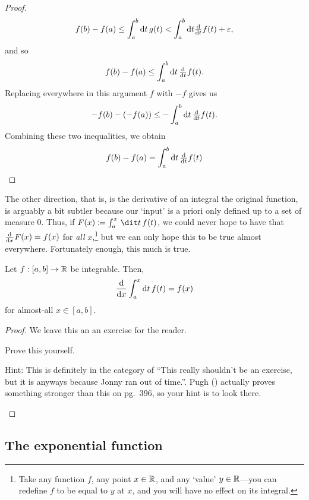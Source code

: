 \begin{thm}
\begin{proof}
\begin{equation}
f(b)-f(a)\leq \int _a^b\mathop{}\!\mathrm{d} t\, g(t)<\int _a^b\mathop{}\!\mathrm{d} t\tfrac{\mathop{}\!\mathrm{d}}{\mathop{}\!\mathrm{d} t}f(t)+\varepsilon ,
\end{equation}
and so
\begin{equation}
f(b)-f(a)\leq \int _a^b\mathop{}\!\mathrm{d} t\, \tfrac{\mathop{}\!\mathrm{d}}{\mathop{}\!\mathrm{d} t}f(t).
\end{equation}
Replacing everywhere in this argument $f$ with $-f$ gives us
\begin{equation}
-f(b)-(-f(a))\leq -\int _a^b\mathop{}\!\mathrm{d} t\, \tfrac{\mathop{}\!\mathrm{d}}{\mathop{}\!\mathrm{d} t}f(t).
\end{equation}
Combining these two inequalities, we obtain
\begin{equation}
f(b)-f(a)=\int _a^b\mathop{}\!\mathrm{d} t\, \tfrac{\mathop{}\!\mathrm{d}}{\mathop{}\!\mathrm{d} t}f(t)
\end{equation}
\end{proof}
\end{thm}
The other direction, that is, is the derivative of an integral the original function, is arguably a bit subtler because our `input' is a priori only defined up to a set of measure $0$.  Thus, if $F(x)\coloneqq \int _a^x\, \dit t\, f(t)$, we could never hope to have that $\frac{\mathop{}\!\mathrm{d}}{\mathop{}\!\mathrm{d} x}F(x)=f(x)$ for \emph{all} $x$,\footnote{Take any function $f$, any point $x\in \mathbb{R}$, and any `value' $y\in \mathbb{R}$---you can redefine $f$ to be equal to $y$ at $x$, and you will have no effect on its integral.} but we can only hope this to be true almost everywhere.  Fortunately enough, this much is true.
\begin{thm}\label{FTCI}
Let $f:[a,b]\rightarrow \mathbb{R}$ be integrable.  Then,
\begin{equation}
\frac{\mathop{}\!\mathrm{d}}{\mathop{}\!\mathrm{d} x}\int _a^x\mathop{}\!\mathrm{d} t\, f(t)=f(x)
\end{equation}
for almost-all $x\in [a,b]$.
\begin{proof}
We leave this an an exercise for the reader.
\begin{exr}
Prove this yourself.
\begin{rmk}
Hint:  This is definitely in the category of ``This really shouldn't be an exercise, but it is anyways because Jonny ran out of time.''.  Pugh (\cite{Pugh}) actually proves something stronger than this on pg.~396, so your hint is to look there.
\end{rmk}
\end{exr}
\end{proof}
\end{thm}

\subsection{The exponential function}

